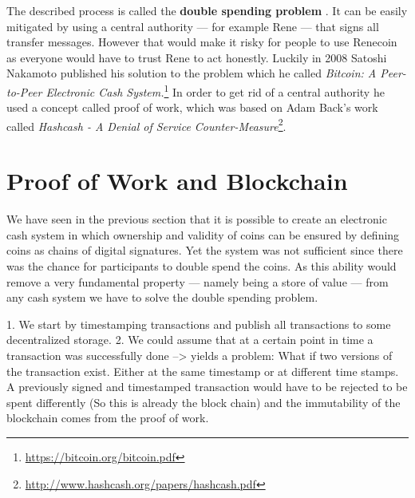 \documentclass[a4paper,12pt,oneside,openany]{book}
\begin{document}
The described process is called the \textbf{double spending problem}
.  It can be easily mitigated by using a
central authority --- for example Rene --- that signs all transfer
messages.  However that would make it risky for people to use Renecoin
as everyone would have to trust Rene to act honestly.  Luckily in 2008
Satoshi Nakamoto published his solution to the problem which he called
\textit{Bitcoin: A Peer-to-Peer Electronic Cash
  System.}\footnote{\url{https://bitcoin.org/bitcoin.pdf}} In order to
get rid of a central authority he used a concept called proof of work,
which was based on Adam Back's work called \textit{Hashcash - A Denial
  of Service
  Counter-Measure}\footnote{\url{http://www.hashcash.org/papers/hashcash.pdf}}.

\section{Proof of Work and Blockchain}
We have seen in the previous section that it is possible to create an
electronic cash system in which ownership and validity of coins can be
ensured by defining coins as chains of digital signatures.  Yet the
system was not sufficient since there was the chance for participants to
double spend the coins.  As this ability would remove a very fundamental
property --- namely being a store of value ---  from any cash system we have to solve the
double spending problem.


 1. We
start by timestamping transactions and publish all transactions to some
decentralized storage.  2. We could assume that at a certain point in
time a transaction was successfully done --> yields a problem: What if
two versions of the transaction exist. Either at the same timestamp or
at different time stamps. A previously signed and timestamped
transaction would have to be rejected to be spent differently (So this
is already the block chain) and the immutability of the blockchain comes
from the proof of work.
\end{document}
